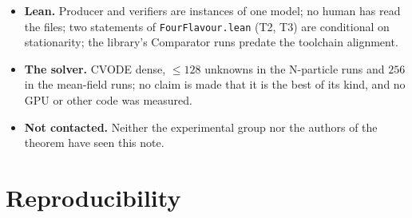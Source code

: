\documentclass[11pt,a4paper]{article}
\begin{document}
\begin{itemize}[nosep]
four-flavour theorems are statements about the authors' own model (the authors' public code, which adds a phase term to the energy, was
not used).
\item \textbf{Lean.} Producer and verifiers are instances of one model; no human has read the files; two statements of
\texttt{FourFlavour.lean} (T2, T3) are conditional on stationarity; the library's Comparator runs predate the toolchain alignment.
\item \textbf{The solver.} CVODE dense, $\le128$ unknowns in the N-particle runs and $256$ in the mean-field runs; no claim is made
that it is the best of its kind, and no GPU or other code was measured.
\item \textbf{Not contacted.} Neither the experimental group nor the authors of the theorem have seen this note.
\end{itemize}

\section*{Reproducibility}
\end{document}
